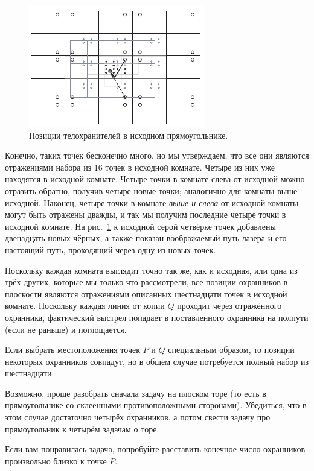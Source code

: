 \begin{figure}[b!]
\centering
\includegraphics[scale=1]{pics/room3}
\caption{Позиции телохранителей в исходном прямоугольнике.}
\label{pic:room3}
\end{figure}

Конечно, таких точек бесконечно много, но мы утверждаем, что все они являются отражениями набора из 16 точек в исходной комнате.
Четыре из них уже находятся в исходной комнате.
Четыре точки в комнате слева от исходной можно отразить обратно, получив четыре новые точки; аналогично для комнаты выше исходной.
Наконец, четыре точки в комнате \emph{выше и слева} от исходной комнаты могут быть отражены дважды, и так мы получим последние четыре точки в исходной комнате.
На рис.~\ref{pic:room3} к исходной серой четвёрке точек добавлены двенадцать новых чёрных,
а также показан воображаемый путь лазера и его настоящий путь, проходящий через одну из новых точек.

Поскольку каждая комната выглядит точно так же, как и исходная, или одна из трёх других, которые мы только что рассмотрели, все позиции охранников в плоскости являются отражениями описанных шестнадцати точек в исходной комнате.
Поскольку каждая линия от копии $Q$ проходит через отражённого охранника, фактический выстрел попадает в поставленного охранника на полпути (если не раньше) и поглощается.

Если выбрать местоположения точек $P$ и $Q$ специальным образом, то позиции некоторых охранников совпадут, но в общем случае потребуется полный набор из шестнадцати.

\begin{addedbytheeditors}
Возможно, проще разобрать сначала задачу на плоском торе (то есть в прямоугольнике со склеенными противоположными сторонами).
Убедиться, что в этом случае достаточно четырёх охранников, а потом свести   задачу про прямоугольник к четырём задачам о торе.

Если вам понравилась задача, попробуйте расставить конечное число охранников произвольно близко к точке $P$.\pr
\end{addedbytheeditors}



